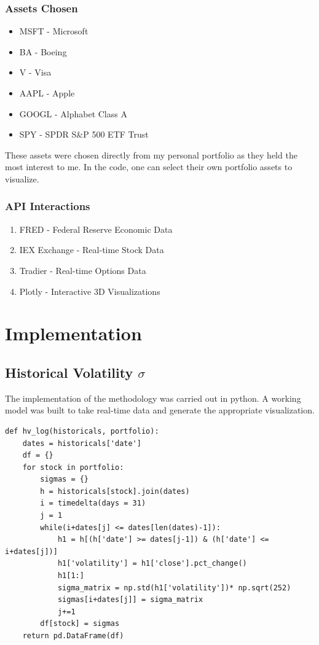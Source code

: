 \documentclass{article}
\begin{document}
\subsubsection {Assets Chosen}
\begin{itemize}
\item MSFT - Microsoft
\item BA - Boeing
\item V - Visa 
\item AAPL - Apple
\item GOOGL - Alphabet Class A
\item SPY -  SPDR S&P 500 ETF Trust
\end{itemize}
\begin{flushleft} 
These assets were chosen directly from my personal portfolio as they held the most interest to me. In the code, one can select their own portfolio assets to visualize. 
\end{flushleft}
\subsubsection {API Interactions}
\begin{enumerate}
\item FRED - Federal Reserve Economic Data
\item IEX Exchange - Real-time Stock Data 
\item Tradier - Real-time Options Data
\item Plotly - Interactive 3D Visualizations
\end{enumerate}
\newpage


\section{Implementation}
\subsection{Historical Volatility $\sigma$}
\begin{flushleft}
The implementation of the methodology was carried out in python. A working model was built to take real-time data and generate the appropriate visualization. 
\begin{verbatim}
def hv_log(historicals, portfolio):
    dates = historicals['date']
    df = {}
    for stock in portfolio:
        sigmas = {}
        h = historicals[stock].join(dates)
        i = timedelta(days = 31)
        j = 1
        while(i+dates[j] <= dates[len(dates)-1]):
            h1 = h[(h['date'] >= dates[j-1]) & (h['date'] <= i+dates[j])]
            h1['volatility'] = h1['close'].pct_change()
            h1[1:]
            sigma_matrix = np.std(h1['volatility'])* np.sqrt(252)
            sigmas[i+dates[j]] = sigma_matrix
            j+=1
        df[stock] = sigmas
    return pd.DataFrame(df)
\end{verbatim}
\end{flushleft}
\end{document}
